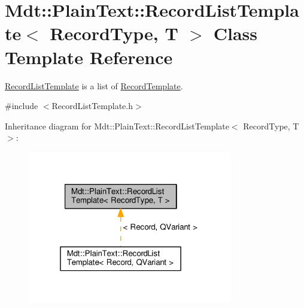\hypertarget{class_mdt_1_1_plain_text_1_1_record_list_template}{}\section{Mdt\+:\+:Plain\+Text\+:\+:Record\+List\+Template$<$ Record\+Type, T $>$ Class Template Reference}
\label{class_mdt_1_1_plain_text_1_1_record_list_template}


\hyperlink{class_mdt_1_1_plain_text_1_1_record_list_template}{Record\+List\+Template} is a list of \hyperlink{class_mdt_1_1_plain_text_1_1_record_template}{Record\+Template}.  




{\ttfamily \#include $<$Record\+List\+Template.\+h$>$}



Inheritance diagram for Mdt\+:\+:Plain\+Text\+:\+:Record\+List\+Template$<$ Record\+Type, T $>$\+:\nopagebreak
\begin{figure}[H]
\begin{center}
\leavevmode
\includegraphics[width=253pt]{class_mdt_1_1_plain_text_1_1_record_list_template__inherit__graph}
\end{center}
\end{figure}
